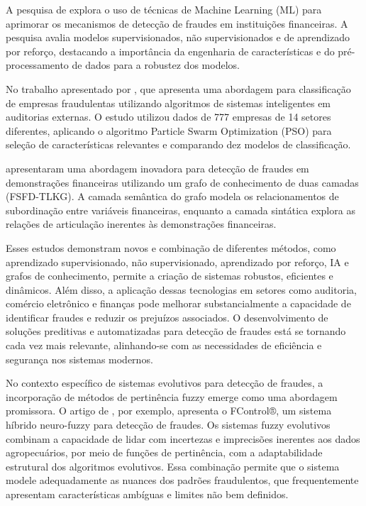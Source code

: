 A pesquisa de  explora o uso de técnicas de Machine Learning (ML) para aprimorar os mecanismos de detecção de fraudes em instituições financeiras. A pesquisa avalia modelos supervisionados, não supervisionados e de aprendizado por reforço, destacando a importância da engenharia de características e do pré-processamento de dados para a robustez dos modelos. 

No trabalho apresentado por , que apresenta uma abordagem para classificação de empresas fraudulentas utilizando algoritmos de sistemas inteligentes em auditorias externas. O estudo utilizou dados de 777 empresas de 14 setores diferentes, aplicando o algoritmo Particle Swarm Optimization (PSO) para seleção de características relevantes e comparando dez modelos de classificação. 

 apresentaram uma abordagem inovadora para detecção de fraudes em demonstrações financeiras utilizando um grafo de conhecimento de duas camadas (FSFD-TLKG). A camada semântica do grafo modela os relacionamentos de subordinação entre variáveis financeiras, enquanto a camada sintática explora as relações de articulação inerentes às demonstrações financeiras. 

Esses estudos demonstram novos e combinação de diferentes métodos, como aprendizado supervisionado, não supervisionado, aprendizado por reforço, IA e grafos de conhecimento, permite a criação de sistemas robustos, eficientes e dinâmicos. Além disso, a aplicação dessas tecnologias em setores como auditoria, comércio eletrônico e finanças pode melhorar substancialmente a capacidade de identificar fraudes e reduzir os prejuízos associados. O desenvolvimento de soluções preditivas e automatizadas para detecção de fraudes está se tornando cada vez mais relevante, alinhando-se com as necessidades de eficiência e segurança nos sistemas modernos.

No contexto específico de sistemas evolutivos para detecção de fraudes, a incorporação de métodos de pertinência fuzzy emerge como uma abordagem promissora. O artigo de , por exemplo, apresenta o FControl®, um sistema híbrido neuro-fuzzy para detecção de fraudes. Os sistemas fuzzy evolutivos combinam a capacidade de lidar com incertezas e imprecisões inerentes aos dados agropecuários, por meio de funções de pertinência, com a adaptabilidade estrutural dos algoritmos evolutivos. Essa combinação permite que o sistema modele adequadamente as nuances dos padrões fraudulentos, que frequentemente apresentam características ambíguas e limites não bem definidos.

